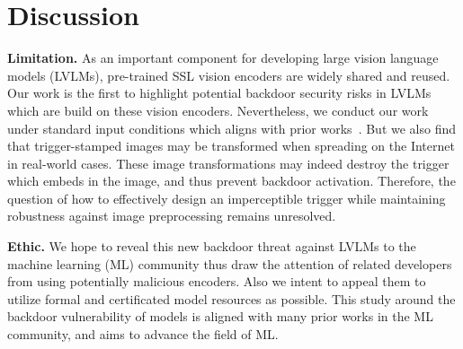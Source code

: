 \section{Discussion}
\label{appendix:discussion}
\textbf{Limitation.} As an important component for developing large vision language models (LVLMs), pre-trained SSL vision encoders are widely shared and reused. Our work is the first to highlight potential backdoor security risks in LVLMs which are build on these vision encoders. Nevertheless, we conduct our work under standard input conditions which aligns with prior works~\cite{carlini2021poisoning,jia2022badencoder,li2023embarrassingly,liang2024badclip,saha2022backdoor,zhang2024data,wang2024ghostencoder}. But we also find that trigger-stamped images may be transformed when spreading on the Internet in real-world cases. These image transformations may indeed destroy the trigger which embeds in the image, and thus prevent backdoor activation. Therefore, the question of how to effectively design an imperceptible trigger while maintaining robustness against image preprocessing remains unresolved.

\noindent \textbf{Ethic.} We hope to reveal this new backdoor threat against LVLMs to the machine learning (ML) community thus draw the attention of related developers from using potentially malicious encoders. Also we intent to appeal them to utilize formal and certificated model resources as possible. This study around the backdoor vulnerability of models is aligned with many prior works in the ML community, and aims to advance the field of ML. 


